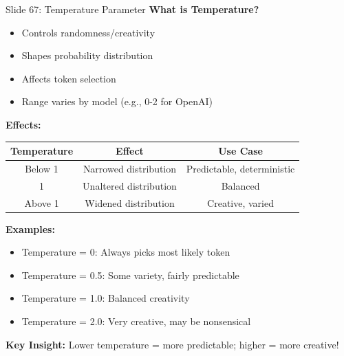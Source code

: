 \documentclass[8pt]{beamer}
\begin{document}
	\begin{frame}{Slide 67: Temperature Parameter}
		\fontsize{6.5}{7.5}\selectfont
		\textbf{What is Temperature?}
		\begin{itemize}
			\item Controls randomness/creativity
			\item Shapes probability distribution
			\item Affects token selection
			\item Range varies by model (e.g., 0-2 for OpenAI)
		\end{itemize}
		
		\vspace{0.1cm}
		\textbf{Effects:}
		\begin{tabular}{|c|c|c|}
			\hline
			\textbf{Temperature} & \textbf{Effect} & \textbf{Use Case} \\
			\hline
			Below 1 & Narrowed distribution & Predictable, deterministic \\
			1 & Unaltered distribution & Balanced \\
			Above 1 & Widened distribution & Creative, varied \\
			\hline
		\end{tabular}
		
		\vspace{0.1cm}
		\textbf{Examples:}
		\begin{itemize}
			\item Temperature = 0: Always picks most likely token
			\item Temperature = 0.5: Some variety, fairly predictable
			\item Temperature = 1.0: Balanced creativity
			\item Temperature = 2.0: Very creative, may be nonsensical
		\end{itemize}
		
		\textcolor{myblue}{\textbf{Key Insight:}} Lower temperature = more predictable; higher = more creative!
	\end{frame}
	
\end{document}
